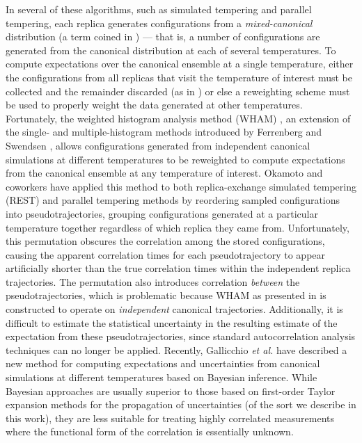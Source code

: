 In several of these algorithms, such as simulated tempering and parallel tempering, each replica generates configurations from a \emph{mixed-canonical} distribution (a term coined in \cite{fischer:1998a}) --- that is, a number of configurations are generated from the canonical distribution at each of several temperatures.  To compute expectations over the canonical ensemble at a single temperature, either the configurations from all replicas that visit the temperature of interest must be collected and the remainder discarded (as in \cite{sanbonmatsu:2002a}) or else a reweighting scheme must be used to properly weight the data generated at other temperatures.  Fortunately, the weighted histogram analysis method (WHAM) \cite{kumar:1992a}, an extension of the single- and multiple-histogram methods introduced by Ferrenberg and Swendsen \cite{ferrenberg:1988a,ferrenberg:1989a}, allows configurations generated from independent canonical simulations at different temperatures to be reweighted to compute expectations from the canonical ensemble at any temperature of interest.  Okamoto and coworkers have applied this method to both replica-exchange simulated tempering (REST) \cite{mitsutake:2000a} and parallel tempering \cite{sugita:1999a} methods by reordering sampled configurations into pseudotrajectories, grouping configurations generated at a particular temperature together regardless of which replica they came from.  Unfortunately, this permutation obscures the correlation among the stored configurations, causing the apparent correlation times for each pseudotrajectory to appear artificially shorter than the true correlation times within the independent replica trajectories.  The permutation also introduces correlation \emph{between} the pseudotrajectories, which is problematic because WHAM as presented in \cite{kumar:1992a} is constructed to operate on \emph{independent} canonical trajectories.  Additionally, it is difficult to estimate the statistical uncertainty in the resulting estimate of the expectation from these pseudotrajectories, since standard autocorrelation analysis techniques \cite{mueller-krumbhaar:1973a,swope:1982a,flyvbjerg:1989a,janke:2002a} can no longer be applied.  Recently, Gallicchio \emph{et al.} \cite{gallicchio:2005a} have described a new method for computing expectations and uncertainties from canonical simulations at different temperatures based on Bayesian inference.  While Bayesian approaches are usually superior to those based on first-order Taylor expansion methods for the propagation of uncertainties (of the sort we describe in this work), they are less suitable for treating highly correlated measurements where the functional form of the correlation is essentially unknown.

